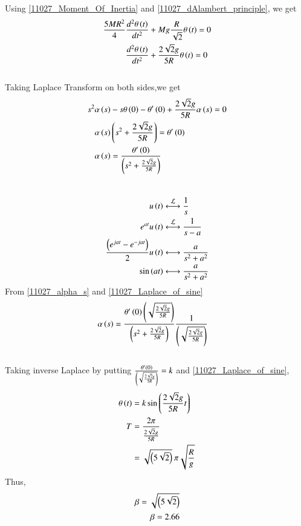 \documentclass[journal,12pt,twocolumn]{IEEEtran}
\theoremstyle{remark}
\begin{document}
Using \eqref{11027_Moment_Of_Inertia} and \eqref{11027_dAlambert_principle}, we get
\begin{align}
	\frac{5MR^2}{4}&\frac{d^2 \theta \left(t\right)}{dt^2} + Mg\frac{R}{\sqrt{2}} \theta \left(t\right) = 0\\
	&\frac{d^2 \theta \left(t\right)}{dt^2} + \frac{2\sqrt{2}g}{5R} \theta \left(t\right)= 0 	
\end{align}
\\
Taking Laplace Transform on both sides,we get
\begin{align}
	s^2\alpha \left(s\right) &- s \theta \left(0\right) - \theta ' \left(0\right) + \frac{2\sqrt{2}g}{5R} \alpha\left(s\right)= 0\\
	\alpha\left(s\right)&\left(s^2+\frac{2\sqrt{2}g}{5R}\right) = \theta ' \left(0\right)\\
	\alpha\left(s\right)&= \frac{\theta ' \left(0\right)}{\left(s^2 + \frac{2\sqrt{2}g}{5R}\right)} \label{11027_alpha_s}
\end{align}
\\
\begin{align}
	u\brak{t}&\system{L}\frac{1}{s}\\
	e^{at}u\brak{t}&\system{L}\frac{1}{s-a}\\
	\frac{\brak{e^{jat} - e^{-jat}}}{2}u\brak{t}&\system \frac{a}{s^2+a^2}\\
	\sin\brak{at}&\system\frac{a}{s^2+a^2} \label{11027_Laplace_of_sine}
\end{align}
From \eqref{11027_alpha_s} and \eqref{11027_Laplace_of_sine}
\begin{align}
	\alpha\left(s\right)&= \frac{\theta ' \left(0\right) \left(\sqrt{\frac{2\sqrt{2}g}{5R} }\right) }{\left(s^2 + \frac{2\sqrt{2}g}{5R}\right)} \frac{1}{ \left(\sqrt{\frac{2\sqrt{2}g}{5R} }\right) }
\end{align}
\\
Taking inverse Laplace by putting $\frac{\theta ' \left(0\right)}{\left(\sqrt{\frac{2\sqrt{2}g}{5R}}\right)} = k$ and \eqref{11027_Laplace_of_sine}, 
\begin{align}
	\theta \left(t\right) &= k \sin\left(\frac{2\sqrt{2}g}{5R} t\right)\\
	T &= \frac{2 \pi}{\frac{2\sqrt{2}g}{5R}}\\
	&= \sqrt{\left(5\sqrt{2}\right)}\:\pi \sqrt{\frac{R}{g}}
\end{align}
Thus, 
\begin{align}
	\beta = \sqrt{\left(5\sqrt{2}\right)}\\
	\beta = 2.66
\end{align}
\end{document}
